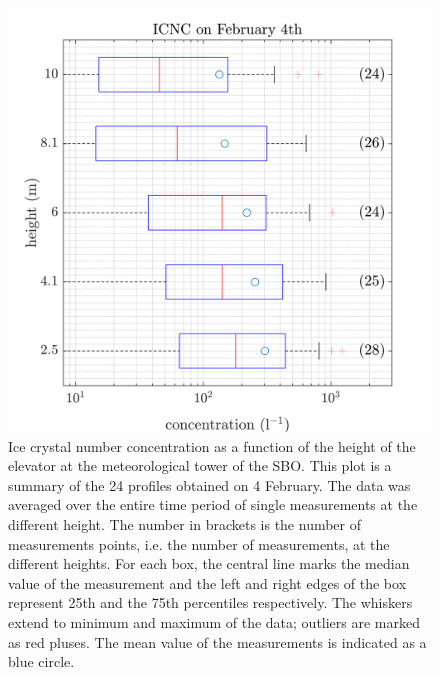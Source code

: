 \documentclass[draft,linenumbers]{agujournal}
\begin{document}
{\begin{figure}[h]
 \centering
 	\includegraphics[width=14cm]{0402_Total.png}
 \caption{Ice crystal number concentration as a function of the height of the elevator at the meteorological tower of the SBO. This plot is a summary of the 24 profiles obtained on 4 February. The data was averaged over the entire time period of single measurements at the different height. The number in brackets is the number of measurements points, i.e. the number of measurements, at the different heights. For each box, the central line marks the median value of the measurement and the left and right edges of the box represent 25th and the 75th percentiles respectively. The whiskers extend to minimum and maximum of the data; outliers are marked as red pluses. The mean value of the measurements is indicated as a blue circle.}
 \label{fig:Total0402}
\end{figure}

}
\end{document}
